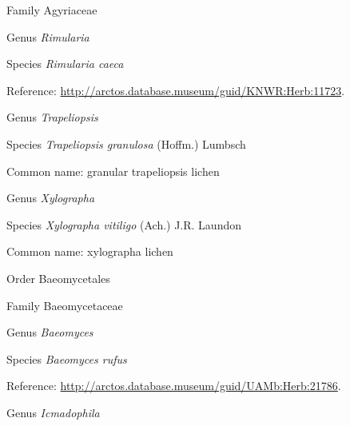 \documentclass[9pt, article]{memoir}
\begin{document}
\begin{multicols}{2}
\vspace{6pt}\noindent\hspace{24pt}Family Agyriaceae


\vspace{6pt}\noindent\hspace{30pt}Genus \textit{Rimularia}


\vspace{6pt}\noindent\hspace{36pt}Species \textit{Rimularia caeca}


Reference: 
\url{http://arctos.database.museum/guid/KNWR:Herb:11723}.

\vspace{6pt}\noindent\hspace{30pt}Genus \textit{Trapeliopsis}


\vspace{6pt}\noindent\hspace{36pt}Species \textit{Trapeliopsis granulosa} (Hoffm.) Lumbsch


Common name: granular trapeliopsis lichen

\vspace{6pt}\noindent\hspace{30pt}Genus \textit{Xylographa}


\vspace{6pt}\noindent\hspace{36pt}Species \textit{Xylographa vitiligo} (Ach.) J.R. Laundon


Common name: xylographa lichen

\vspace{6pt}\noindent\hspace{18pt}Order Baeomycetales


\vspace{6pt}\noindent\hspace{24pt}Family Baeomycetaceae


\vspace{6pt}\noindent\hspace{30pt}Genus \textit{Baeomyces}


\vspace{6pt}\noindent\hspace{36pt}Species \textit{Baeomyces rufus}


Reference: 
\url{http://arctos.database.museum/guid/UAMb:Herb:21786}.

\vspace{6pt}\noindent\hspace{30pt}Genus \textit{Icmadophila}



\end{multicols}
\end{document}
